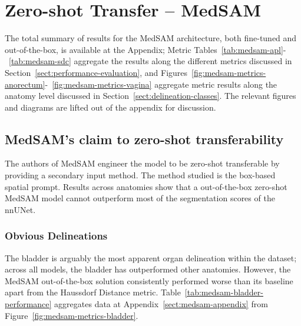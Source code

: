\documentclass[12pt,twoside]{report}
\begin{document}
\section{Zero-shot Transfer -- MedSAM}

The total summary of results for the MedSAM architecture, both fine-tuned and out-of-the-box, is available at the Appendix; Metric Tables~\ref{tab:medsam-apl}-~\ref{tab:medsam-sdc} aggregate the results along the different metrics discussed in Section~\ref{sect:performance-evaluation}, and Figures~\ref{fig:medsam-metrics-anorectum}-~\ref{fig:medsam-metrics-vagina} aggregate metric results along the anatomy level discussed in Section~\ref{sect:delineation-classes}. The relevant figures and diagrams are lifted out of the appendix for discussion.

\subsection{MedSAM's claim to zero-shot transferability}

The authors of MedSAM engineer the model to be zero-shot transferable by providing a secondary input method. The method studied is the box-based spatial prompt. Results across anatomies show that a out-of-the-box zero-shot MedSAM model cannot outperform most of the segmentation scores of the nnUNet.

\subsubsection{Obvious Delineations}\label{icantbeaskedtocomeupwithalabelhopethisdoesntcomebacktobitmeintheass}

The bladder is arguably the most apparent organ delineation within the dataset; across all models, the bladder has outperformed other anatomies. However, the MedSAM out-of-the-box solution consistently performed worse than its baseline apart from the Haussdorf Distance metric. Table~\ref{tab:medsam-bladder-performance} aggregates data at Appendix~\ref{sect:medsam-appendix} from Figure~\ref{fig:medsam-metrics-bladder}.
\end{document}
